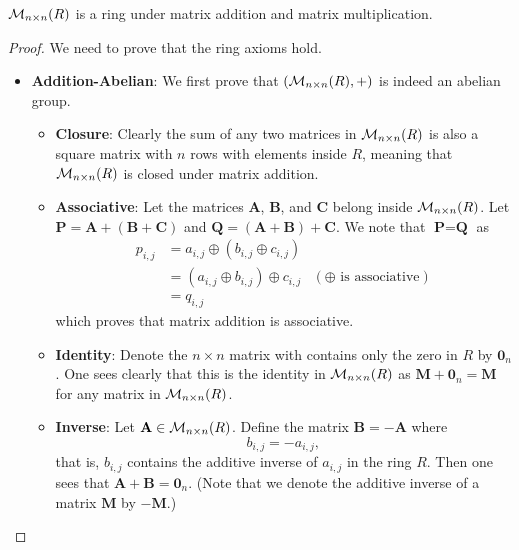 \begin{proposition}
    $\mathcal{M}_{n\times n}(R)$ is a ring under matrix addition and matrix multiplication.
\end{proposition}
\begin{proof}
    We need to prove that the ring axioms hold.
    \begin{itemize}
        \item \textbf{Addition-Abelian}: We first prove that $(\mathcal{M}_{n\times n}(R), +)$ is indeed an abelian group.
        \begin{itemize}
            \item \textbf{Closure}: Clearly the sum of any two matrices in $\mathcal{M}_{n\times n}(R)$ is also a square matrix with $n$ rows with elements inside $R$, meaning that $\mathcal{M}_{n\times n}(R)$ is closed under matrix addition.

            \item \textbf{Associative}: Let the matrices $\textbf{A}$, $\textbf{B}$, and $\textbf{C}$ belong inside $\mathcal{M}_{n\times n}(R)$. Let $\textbf{P} = \textbf{A} + (\textbf{B} + \textbf{C})$ and $\textbf{Q} = (\textbf{A} + \textbf{B}) + \textbf{C}$. We note that $\textbf{P} = \textbf{Q}$ as
            \begin{align*}
                p_{i,j} &= a_{i,j} \oplus (b_{i,j} \oplus c_{i,j})\\
                &= (a_{i,j} \oplus b_{i,j}) \oplus c_{i,j} & (\oplus\text{ is associative})\\
                &= q_{i,j}
            \end{align*}
            which proves that matrix addition is associative.
    
            \item \textbf{Identity}: Denote the $n \times n$ matrix with contains only the zero in $R$ by $\textbf{0}_n$. One sees clearly that this is the identity in $\mathcal{M}_{n\times n}(R)$ as $\textbf{M} + \textbf{0}_n = \textbf{M}$ for any matrix in $\mathcal{M}_{n\times n}(R)$.
            
            \item \textbf{Inverse}: Let $\textbf{A} \in \mathcal{M}_{n\times n}(R)$. Define the matrix $\textbf{B} = -\textbf{A}$ where
            \[
                b_{i,j} = -a_{i,j},    
            \]
            that is, $b_{i,j}$ contains the additive inverse of $a_{i,j}$ in the ring $R$. Then one sees that $\textbf{A} + \textbf{B} = \textbf{0}_n$.\newline
            (Note that we denote the additive inverse of a matrix $\textbf{M}$ by $-\textbf{M}$.)


\end{itemize}
\end{itemize}
\end{proof}
